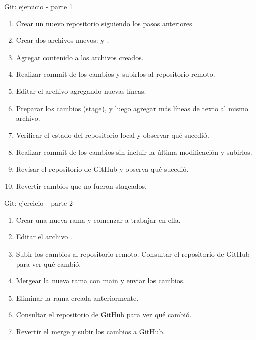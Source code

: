 \documentclass[aspectratio=43,10pt,t]{beamer}
\begin{document}
\begin{frame}
\end{frame}


{
\begin{frame}{Git: ejercicio - parte 1}
  \begin{enumerate}
    \item Crear un nuevo repositorio siguiendo los pasos anteriores.
    \item Crear dos archivos nuevos:  y .
    \item Agregar contenido a los archivos creados.
    \item Realizar commit de los cambios y subirlos al repositorio remoto.
    \item Editar el archivo  agregando nuevas líneas.
    \item Preparar los cambios (stage), y luego agregar más líneas de texto al mismo archivo.
    \item Verificar el estado del repositorio local y observar qué sucedió.
    \item Realizar commit de los cambios sin incluir la última modificación y subirlos.
    \item Revisar el repositorio de GitHub y observa qué sucedió.
    \item Revertir cambios que no fueron stageados.
  \end{enumerate}
\end{frame}}

\begin{frame}{Git: ejercicio - parte 2}
  \begin{enumerate}
    \item Crear una nueva rama y comenzar a trabajar en ella.
    \item Editar el archivo .
    \item Subir los cambios al repositorio remoto. Consultar el repositorio de GitHub para ver qué cambió.
    \item Mergear la nueva rama con main y enviar los cambios.
    \item Eliminar la rama creada anteriormente.
    \item Consultar el repositorio de GitHub para ver qué cambió.
    \item Revertir el merge y subir los cambios a GitHub.
  \end{enumerate}
\end{frame}
\end{document}
